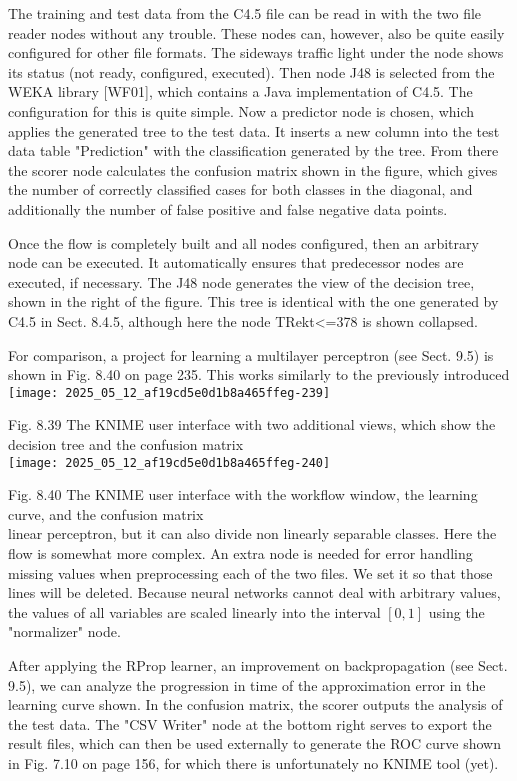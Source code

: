 \documentclass[10pt]{article}
\begin{document}
The training and test data from the C4.5 file can be read in with the two file reader nodes without any trouble. These nodes can, however, also be quite easily configured for other file formats. The sideways traffic light under the node shows its status (not ready, configured, executed). Then node J48 is selected from the WEKA library [WF01], which contains a Java implementation of C4.5. The configuration for this is quite simple. Now a predictor node is chosen, which applies the generated tree to the test data. It inserts a new column into the test data table "Prediction" with the classification generated by the tree. From there the scorer node calculates the confusion matrix shown in the figure, which gives the number of correctly classified cases for both classes in the diagonal, and additionally the number of false positive and false negative data points.

Once the flow is completely built and all nodes configured, then an arbitrary node can be executed. It automatically ensures that predecessor nodes are executed, if necessary. The J48 node generates the view of the decision tree, shown in the right of the figure. This tree is identical with the one generated by C4.5 in Sect. 8.4.5, although here the node TRekt<=378 is shown collapsed.

For comparison, a project for learning a multilayer perceptron (see Sect. 9.5) is shown in Fig. 8.40 on page 235. This works similarly to the previously introduced\\
\texttt{[image: 2025\_05\_12\_af19cd5e0d1b8a465ffeg-239]}

Fig. 8.39 The KNIME user interface with two additional views, which show the decision tree and the confusion matrix\\
\texttt{[image: 2025\_05\_12\_af19cd5e0d1b8a465ffeg-240]}

Fig. 8.40 The KNIME user interface with the workflow window, the learning curve, and the confusion matrix\\
linear perceptron, but it can also divide non linearly separable classes. Here the flow is somewhat more complex. An extra node is needed for error handling missing values when preprocessing each of the two files. We set it so that those lines will be deleted. Because neural networks cannot deal with arbitrary values, the values of all variables are scaled linearly into the interval $[0,1]$ using the "normalizer" node.

After applying the RProp learner, an improvement on backpropagation (see Sect. 9.5), we can analyze the progression in time of the approximation error in the learning curve shown. In the confusion matrix, the scorer outputs the analysis of the test data. The "CSV Writer" node at the bottom right serves to export the result files, which can then be used externally to generate the ROC curve shown in Fig. 7.10 on page 156, for which there is unfortunately no KNIME tool (yet).
\end{document}
